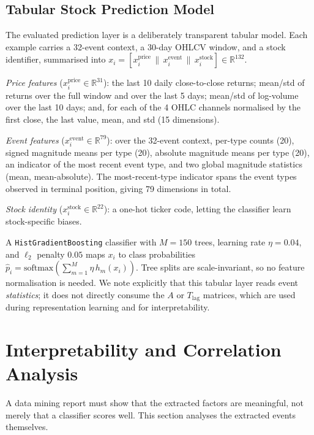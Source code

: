 \documentclass[sigconf,nonacm]{acmart}
\begin{document}
\subsection{Tabular Stock Prediction Model}
\label{sec:tabular}
The evaluated prediction layer is a deliberately transparent tabular
model. Each example carries a 32-event context, a 30-day OHLCV window,
and a stock identifier, summarised into
$x_i=[x_i^{\mathrm{price}}\,\|\,x_i^{\mathrm{event}}\,\|\,x_i^{\mathrm{stock}}]\in\mathbb{R}^{132}$.

\emph{Price features} ($x_i^{\mathrm{price}}\in\mathbb{R}^{31}$): the last
10 daily close-to-close returns; mean/std of returns over the full window
and over the last 5 days; mean/std of log-volume over the last 10 days;
and, for each of the 4 OHLC channels normalised by the first close, the
last value, mean, and std (15 dimensions).

\emph{Event features} ($x_i^{\mathrm{event}}\in\mathbb{R}^{79}$): over the
32-event context, per-type counts (20), signed magnitude means per type
(20), absolute magnitude means per type (20), an indicator of the most
recent event type, and two global magnitude statistics
(mean, mean-absolute). The most-recent-type indicator spans the event
types observed in terminal position, giving 79 dimensions in total.

\emph{Stock identity} ($x_i^{\mathrm{stock}}\in\mathbb{R}^{22}$): a
one-hot ticker code, letting the classifier learn stock-specific biases.

A \texttt{HistGradientBoosting} classifier with $M=150$ trees, learning
rate $\eta=0.04$, and $\ell_2$ penalty $0.05$ maps $x_i$ to class
probabilities $\hat{p}_i=\mathrm{softmax}(\sum_{m=1}^{M}\eta\,h_m(x_i))$.
Tree splits are scale-invariant, so no feature normalisation is needed.
We note explicitly that this tabular layer reads event \emph{statistics};
it does not directly consume the $A$ or $T_{\mathrm{lag}}$ matrices,
which are used during representation learning and for interpretability.

\section{Interpretability and Correlation Analysis}
\label{sec:interpret}
A data mining report must show that the extracted factors are meaningful,
not merely that a classifier scores well. This section analyses the
extracted events themselves.
\end{document}
